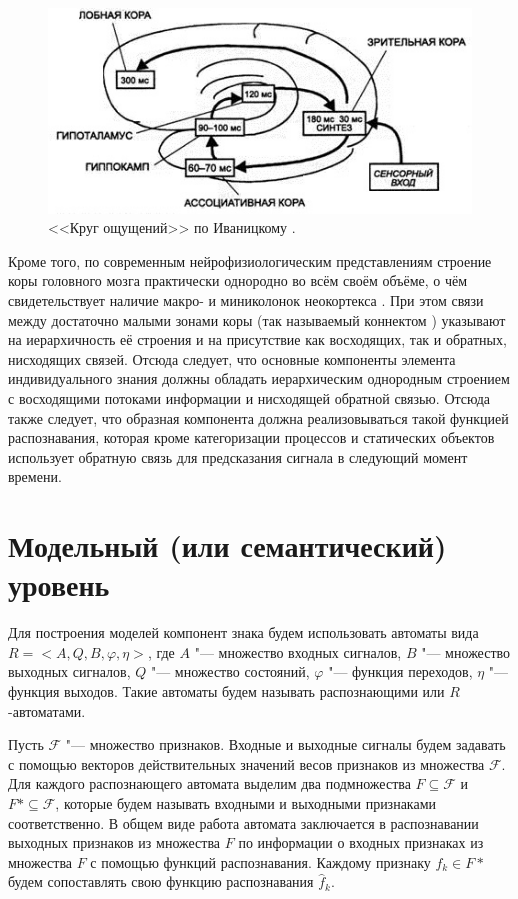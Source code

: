 \documentclass[a4paper, 12pt]{article}
\theoremstyle{plain}
\begin{document}
	\begin{figure}[h]
		\centering
		\includegraphics[width=0.7\linewidth]{ivanitsky_cyrcle}
		\caption{<<Круг ощущений>> по Иваницкому \cite{Aleksandrov2007}.}
		\label{fig:ivan_cyrcle}
	\end{figure}
	
	Кроме того, по современным нейрофизиологическим представлениям строение коры головного мозга практически однородно во всём своём объёме, о чём свидетельствует наличие макро- и миниколонок неокортекса \cite{Mountcastle1998,Rockland2010}. При этом связи между достаточно малыми зонами коры (так называемый коннектом \cite{Zador2012}) указывают на иерархичность её строения и на присутствие как восходящих, так и обратных, нисходящих связей. Отсюда следует, что основные компоненты элемента индивидуального знания должны обладать иерархическим однородным строением с восходящими потоками информации и нисходящей обратной связью. Отсюда также следует, что образная компонента должна реализовываться такой функцией распознавания, которая кроме категоризации процессов и статических объектов использует обратную связь для предсказания сигнала в следующий момент времени.
	
	\section{Модельный (или семантический) уровень}
	Для построения моделей компонент знака будем использовать автоматы вида  $R=<A,Q,B,\varphi, \eta>$, где $A$ "--- множество входных сигналов, $B$ "--- множество выходных сигналов, $Q$ "--- множество состояний, $\varphi$ "--- функция переходов, $\eta$ "--- функция выходов. Такие автоматы будем называть распознающими или $R$-автоматами. 
	
	Пусть $\mathcal F$ "--- множество признаков. Входные и выходные сигналы будем задавать с помощью  векторов действительных значений весов признаков из множества $\mathcal F$. Для каждого распознающего автомата выделим два подмножества $F\subseteq\mathcal F$ и $F*\subseteq\mathcal F$, которые будем называть входными и выходными признаками соответственно. В общем виде работа автомата заключается в распознавании выходных признаков из множества $F$ по информации о входных признаках из множества $F$ с помощью функций распознавания. Каждому признаку $f_k\in F*$ будем сопоставлять свою функцию распознавания $\hat f_k$.
	
\end{document}
